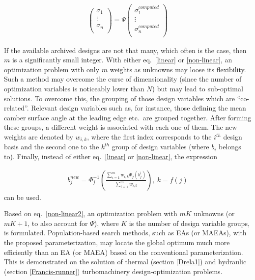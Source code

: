 \begin{eqnarray}
		\left( {\begin{array}{c}
 		\sigma _1  \\
 		\vdots  \\
 		\sigma _n  \\
 		\end{array} } \right) =
 		\Psi  
 		\left( {\begin{array}{c}
 		\sigma _1^{computed}  \\
 		\vdots  \\
 		\sigma _n^{computed}  \\
 		\end{array} } \right)
   \label{cdf-matrix} 
\end{eqnarray}


If the available archived designs are not that many, which often is the case, then $m$ is a significantly small integer.  With either eq.\ \ref{linear} or \ref{non-linear}, an optimization problem with only $m$ weights as unknowns may loose its flexibility. Such a method may overcome the curse of dimensionality (since the number of optimization variables is  noticeably lower than $N$) but may lead to sub-optimal solutions. To overcome this, the grouping of those design variables which are ``co-related''. Relevant design variables such as, for instance, those defining the mean camber surface angle at the leading edge etc.\ are grouped together. After forming these groups, a different weight is associated with each one of them. The new weights are denoted by $w_{i,k}$, where the first index corresponds to the $i^{th}$ design basis and the second one to the $k^{th}$ group of design variables (where $b_i$ belongs to). Finally, instead of either eq.\ \ref{linear} or \ref{non-linear}, the expression


\begin{eqnarray}
   b_j^{new} = \Phi _j^{-1} (\frac{\sum_{i=1}^{m}w_{i,k} \Phi _j(b_j^i)}{\sum_{i=1}^{m}w_{i,k} }),~ k=f(j) 
   \label{non-linear2} 
\end{eqnarray}
can be used. 

Based on eq.\ \ref{non-linear2}, an optimization problem with $m  K$ unknowns (or $m K\!+\!1$, to also account for $\Psi$), where $K$ is the number of design variable groups, is formulated. Population-based search methods, such as EAs (or MAEAs), with the proposed parameterization, may locate the global optimum much more efficiently than an EA (or MAEA) based on the conventional parameterization. This is demonstrated on the solution of  thermal (section \ref{Drela1}) and hydraulic (section \ref{Francis-runner}) turbomachinery design-optimization problems. 


